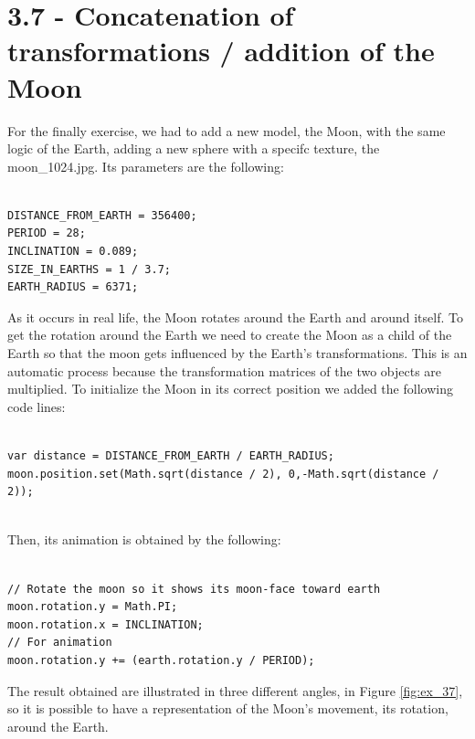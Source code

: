 \documentclass[12pt]{article}
\begin{document}
\section*{3.7 - Concatenation of transformations / addition of the Moon}
\label{ex_37}

For the finally exercise, we had to add a new model, the Moon, with the same logic of the Earth, adding a new sphere with a specifc texture, the moon\_1024.jpg. Its parameters are the following:
\begin{lstlisting}

DISTANCE_FROM_EARTH = 356400;
PERIOD = 28;
INCLINATION = 0.089;
SIZE_IN_EARTHS = 1 / 3.7;
EARTH_RADIUS = 6371;

\end{lstlisting}

As it occurs in real life, the Moon rotates around the Earth and around itself. To get the rotation around the Earth we need to create the Moon as a child of the Earth so that the moon gets influenced by the Earth's transformations. This is an automatic process because the transformation matrices of the two objects are multiplied.\newline
To initialize the Moon in its correct position we added the following code lines:
\begin{lstlisting}

var distance = DISTANCE_FROM_EARTH / EARTH_RADIUS;
moon.position.set(Math.sqrt(distance / 2), 0,-Math.sqrt(distance / 2));


\end{lstlisting}

\noindent
Then, its animation is obtained by the following:

\begin{lstlisting}

// Rotate the moon so it shows its moon-face toward earth
moon.rotation.y = Math.PI;
moon.rotation.x = INCLINATION;
// For animation 
moon.rotation.y += (earth.rotation.y / PERIOD);

\end{lstlisting}

The result obtained are illustrated in three different angles, in Figure \ref{fig:ex_37}, so it is possible to have a representation of the Moon's movement, its rotation, around the Earth.
\end{document}
